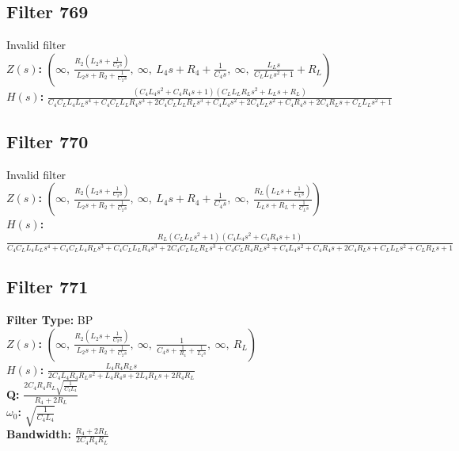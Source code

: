 \documentclass{article}
\begin{document}
\subsection*{Filter 769}
Invalid filter \\ 
\textbf{$Z(s)$:} $\left( \infty, \  \frac{R_{2} \left(L_{2} s + \frac{1}{C_{2} s}\right)}{L_{2} s + R_{2} + \frac{1}{C_{2} s}}, \  \infty, \  L_{4} s + R_{4} + \frac{1}{C_{4} s}, \  \infty, \  \frac{L_{L} s}{C_{L} L_{L} s^{2} + 1} + R_{L}\right)$ \\ 
\textbf{$H(s)$:} $\frac{\left(C_{4} L_{4} s^{2} + C_{4} R_{4} s + 1\right) \left(C_{L} L_{L} R_{L} s^{2} + L_{L} s + R_{L}\right)}{C_{4} C_{L} L_{4} L_{L} s^{4} + C_{4} C_{L} L_{L} R_{4} s^{3} + 2 C_{4} C_{L} L_{L} R_{L} s^{3} + C_{4} L_{4} s^{2} + 2 C_{4} L_{L} s^{2} + C_{4} R_{4} s + 2 C_{4} R_{L} s + C_{L} L_{L} s^{2} + 1}$ \\ 
\subsection*{Filter 770}
Invalid filter \\ 
\textbf{$Z(s)$:} $\left( \infty, \  \frac{R_{2} \left(L_{2} s + \frac{1}{C_{2} s}\right)}{L_{2} s + R_{2} + \frac{1}{C_{2} s}}, \  \infty, \  L_{4} s + R_{4} + \frac{1}{C_{4} s}, \  \infty, \  \frac{R_{L} \left(L_{L} s + \frac{1}{C_{L} s}\right)}{L_{L} s + R_{L} + \frac{1}{C_{L} s}}\right)$ \\ 
\textbf{$H(s)$:} $\frac{R_{L} \left(C_{L} L_{L} s^{2} + 1\right) \left(C_{4} L_{4} s^{2} + C_{4} R_{4} s + 1\right)}{C_{4} C_{L} L_{4} L_{L} s^{4} + C_{4} C_{L} L_{4} R_{L} s^{3} + C_{4} C_{L} L_{L} R_{4} s^{3} + 2 C_{4} C_{L} L_{L} R_{L} s^{3} + C_{4} C_{L} R_{4} R_{L} s^{2} + C_{4} L_{4} s^{2} + C_{4} R_{4} s + 2 C_{4} R_{L} s + C_{L} L_{L} s^{2} + C_{L} R_{L} s + 1}$ \\ 
\subsection*{Filter 771}
\textbf{Filter Type:} BP \\ 
\textbf{$Z(s)$:} $\left( \infty, \  \frac{R_{2} \left(L_{2} s + \frac{1}{C_{2} s}\right)}{L_{2} s + R_{2} + \frac{1}{C_{2} s}}, \  \infty, \  \frac{1}{C_{4} s + \frac{1}{R_{4}} + \frac{1}{L_{4} s}}, \  \infty, \  R_{L}\right)$ \\ 
\textbf{$H(s)$:} $\frac{L_{4} R_{4} R_{L} s}{2 C_{4} L_{4} R_{4} R_{L} s^{2} + L_{4} R_{4} s + 2 L_{4} R_{L} s + 2 R_{4} R_{L}}$ \\ 
\textbf{Q:} $\frac{2 C_{4} R_{4} R_{L} \sqrt{\frac{1}{C_{4} L_{4}}}}{R_{4} + 2 R_{L}}$ \\ 
\textbf{$\omega_0$:} $\sqrt{\frac{1}{C_{4} L_{4}}}$ \\ 
\textbf{Bandwidth:} $\frac{R_{4} + 2 R_{L}}{2 C_{4} R_{4} R_{L}}$ \\ 
\end{document}
